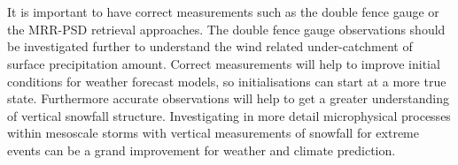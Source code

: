 \\
\\
It is important to have correct measurements such as the double fence gauge or the MRR-PSD retrieval approaches. The double fence gauge observations should be investigated further to understand the wind related under-catchment of surface precipitation amount. Correct measurements will help to improve initial conditions for weather forecast models, so initialisations can start at a more true state. Furthermore accurate observations will help to get a greater understanding of vertical snowfall structure.
Investigating in more detail microphysical processes within mesoscale storms with vertical measurements of snowfall for extreme events can be a grand improvement for weather and climate prediction. 

